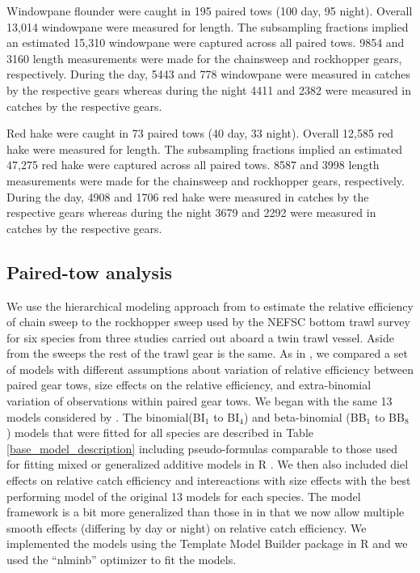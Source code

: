 \documentclass[]{article}
\begin{document}
Windowpane flounder were caught in 195 paired tows (100 day, 95 night).
Overall 13,014 windowpane were measured for length. The subsampling
fractions implied an estimated 15,310 windowpane were captured across
all paired tows. 9854 and 3160 length measurements were made for the
chainsweep and rockhopper gears, respectively. During the day, 5443 and
778 windowpane were measured in catches by the respective gears whereas
during the night 4411 and 2382 were measured in catches by the
respective gears.

Red hake were caught in 73 paired tows (40 day, 33 night). Overall
12,585 red hake were measured for length. The subsampling fractions
implied an estimated 47,275 red hake were captured across all paired
tows. 8587 and 3998 length measurements were made for the chainsweep and
rockhopper gears, respectively. During the day, 4908 and 1706 red hake
were measured in catches by the respective gears whereas during the
night 3679 and 2292 were measured in catches by the respective gears.

\hypertarget{paired-tow-analysis}{%
\subsection{Paired-tow analysis}\label{paired-tow-analysis}}

We use the hierarchical modeling approach from \citet{miller13} to
estimate the relative efficiency of chain sweep to the rockhopper sweep
used by the NEFSC bottom trawl survey for six species from three studies
carried out aboard a twin trawl vessel. Aside from the sweeps the rest
of the trawl gear is the same. As in \citet{miller13}, we compared a set
of models with different assumptions about variation of relative
efficiency between paired gear tows, size effects on the relative
efficiency, and extra-binomial variation of observations within paired
gear tows. We began with the same 13 models considered by
\citet{miller13}. The binomial(BI\(_1\) to BI\(_4\)) and beta-binomial
(BB\(_1\) to BB\(_8\)) models that were fitted for all species are
described in Table \ref{base_model_description} including
pseudo-formulas comparable to those used for fitting mixed or
generalized additive models in R \citep{R19, wood06}. We then also
included diel effects on relative catch efficiency and intereactions
with size effects with the best performing model of the original 13
models for each species. The model framework is a bit more generalized
than those in \citep{miller13} in that we now allow multiple smooth
effects (differing by day or night) on relative catch efficiency. We
implemented the models using the Template Model Builder package
\citep{kristensenetal16} in R and we used the ``nlminb'' optimizer to
fit the models.
\end{document}
